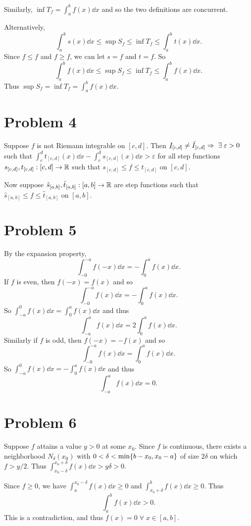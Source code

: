 \documentclass[12pt]{article}
\begin{document}
Similarly, $\inf T_{f} = \int_{a}^{b} f(x) \dd x$ and so the two definitions are concurrent.

Alternatively, \[
    \int_{a}^{b} s(x) \dd x \leq \sup S_{f} \leq \inf T_{f} \leq \int_{a}^{b} t(x) \dd x.
\] Since $f \leq f$ and $f \geq f$, we can let $s = f$ and $t = f$. So \[
    \int_{a}^{b} f(x) \dd x \leq \sup S_{f} \leq \inf T_{f} \leq \int_{a}^{b} f(x) \dd x.
\] Thus $\sup S_{f} = \inf T_{f} = \int_{a}^{b} f(x) \dd x$.


\section*{Problem 4}
Suppose $f$ is not Riemann integrable on $[c, d]$.
Then $\ubar{I}_{[c, d]} \neq \bar{I}_{[c, d]} \implies \;\exists\; \varepsilon > 0$ such that $\int_{c}^{d} t_{[c, d]}(x) \dd x - \int_{c}^{d} s_{[c, d]}(x) \dd x > \varepsilon$ for all step functions $s_{[c, d]}, t_{[c, d]} : [c, d] \to \mathbb{R}$ such that $s_{[c, d]} \leq f \leq t_{[c, d]}$ on $[c, d]$.

Now suppose $\hat{s}_{[a, b]}, \hat{t}_{[a, b]} : [a, b] \to \mathbb{R}$ are step functions such that $\hat{s}_{[a, b]} \leq f \leq \hat{t}_{[a, b]}$ on $[a, b]$.


\section*{Problem 5}
By the expansion property, \[
    \int_{-0}^{-a} f(-x) \dd x = -\int_{0}^{a} f(x) \dd x.
\]
If $f$ is even, then $f(-x) = f(x)$ and so \[
    \int_{-0}^{-a} f(x) \dd x = -\int_{0}^{a} f(x) \dd x.
\] So $\int_{-a}^{0} f(x) \dd x = \int_{0}^{a} f(x) \dd x$ and thus \[
    \int_{-a}^{a} f(x) \dd x = 2 \int_{0}^{a} f(x) \dd x.
\] Similarly if $f$ is odd, then $f(-x) = -f(x)$ and so \[
    \int_{-0}^{-a} f(x) \dd x = \int_{0}^{a} f(x) \dd x.
\] So $\int_{-a}^{0} f(x) \dd x = -\int_{0}^{a} f(x) \dd x$ and thus \[
    \int_{-a}^{a} f(x) \dd x = 0.
\]


\section*{Problem 6}
Suppose $f$ attains a value $y > 0$ at some $x_{0}$. Since $f$ is continuous, there exists a neighborhood $N_{\delta}(x_{0})$ with $0 < \delta < \min \set{b - x_{0}, x_{0} - a}$ of size $2 \delta$ on which $f > y/2$.
Thus $\int_{x_{0} - \delta}^{x_{0} + \delta} f(x) \dd x > y \delta > 0$.

Since $f \geq 0$, we have $\int_{a}^{x_{0} - \delta} f(x) \dd x \geq 0$ and $\int_{x_{0} + \delta}^{b} f(x) \dd x \geq 0$. Thus \[
    \int_{a}^{b} f(x) \dd x > 0.
\] This is a contradiction, and thus $f(x) = 0 \;\forall\; x \in [a, b]$.
\end{document}
